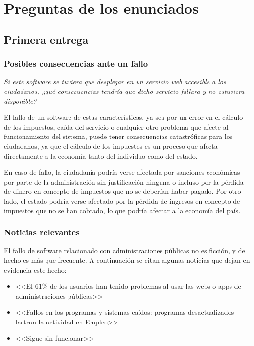 \chapter{Preguntas de los enunciados}
\section{Primera entrega}
\subsection{Posibles consecuencias ante un fallo}
\textit{Si este software se tuviera que desplegar en un servicio web accesible a los ciudadanos,
¿qué consecuencias tendría que dicho servicio fallara y no estuviera disponible?}

El fallo de un software de estas características, ya sea por un error en el cálculo de los impuestos, caída
del servicio o cualquier otro problema que afecte al funcionamiento del sistema, puede tener consecuencias
catastróficas para los ciudadanos, ya que el cálculo de los impuestos es un proceso que afecta directamente
a la economía tanto del individuo como del estado.

En caso de fallo, la ciudadanía podría verse afectada por sanciones económicas por parte de la administración
sin justificación ninguna o incluso por la pérdida de dinero en concepto de impuestos que no se deberían haber
pagado. Por otro lado, el estado podría verse afectado por la pérdida de ingresos en concepto de impuestos que
no se han cobrado, lo que podría afectar a la economía del país.

\subsection{Noticias relevantes}
El fallo de software relacionado con administraciones públicas no es ficción, y de hecho es
más que frecuente. A continuación se citan algunas noticias que dejan en evidencia este hecho:
\begin{itemize}
	\item <<El 61\% de los usuarios han tenido problemas al usar las webs o apps de administraciones públicas>>~\cite{newtral}
	\item <<Fallos en los programas y sistemas caídos: programas desactualizados lastran la actividad en Empleo>>~\cite{abc}
	\item <<Sigue sin funcionar>>~\cite{elpais}
\end{itemize}

